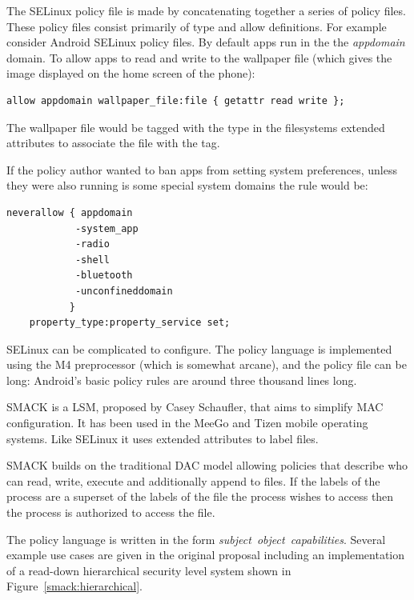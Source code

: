 \documentclass[a4paper]{article}
\begin{document}
The SELinux policy file is made by concatenating together a series of policy
files.  These policy files consist primarily of type and allow definitions.
For example consider Android SELinux policy files.  By default apps run in the
the \emph{appdomain} domain.  To allow apps to read and write to the wallpaper
file (which gives the image displayed on the home screen of the phone):

\begin{lstlisting}[language=selinux]
allow appdomain wallpaper_file:file { getattr read write };
\end{lstlisting}

The wallpaper file would be tagged with the  type in the
filesystems extended attributes to associate the file with the tag.

If the policy author wanted to ban apps from setting system preferences, unless
they were also running is some special system domains the rule would be:

\begin{lstlisting}[language=selinux]
neverallow { appdomain 
            -system_app 
            -radio 
            -shell 
            -bluetooth 
            -unconfineddomain
           }
    property_type:property_service set;
\end{lstlisting}

SELinux can be complicated to configure.  The policy language is implemented
using the M4 preprocessor (which is somewhat arcane), and the policy file can be
long: Android's basic policy rules are around three thousand lines long.

SMACK is a \ac{LSM}, proposed by Casey Schaufler\cite{Shaufler:_OMTJQq8}, that
aims to simplify \ac{MAC} configuration.  It has been used in the MeeGo and
Tizen mobile operating systems.  Like SELinux it uses extended attributes to
label files.

SMACK builds on the traditional \ac{DAC} model allowing policies that describe
who can read, write, execute and additionally append to files.  If the labels of
the process are a superset of the labels of the file the process wishes to
access then the process is authorized to access the file.

The policy language is written in the form \emph{subject~object~capabilities}.
Several example use cases are given in the original proposal including an
implementation of a read-down hierarchical security level system shown in
Figure~\ref{smack:hierarchical}.
\end{document}
